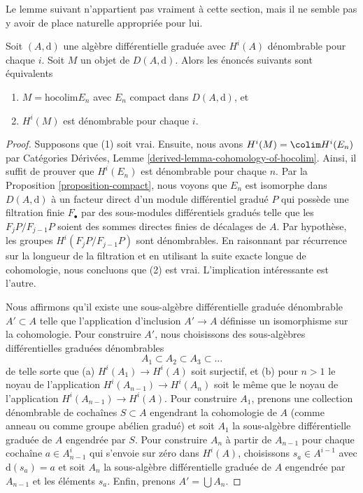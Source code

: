 \noindent
Le lemme suivant n'appartient pas vraiment à cette section, mais il ne semble pas
y avoir de place naturelle appropriée pour lui.

\begin{lemma}
\label{lemma-countable}
Soit $(A, \text{d})$ une algèbre différentielle graduée avec $H^i(A)$ dénombrable
pour chaque $i$. Soit $M$ un objet de $D(A, \text{d})$. Alors les énoncés suivants
sont équivalents
\begin{enumerate}
\item $M = \text{hocolim} E_n$ avec $E_n$ compact dans $D(A, \text{d})$, et
\item $H^i(M)$ est dénombrable pour chaque $i$.
\end{enumerate}
\end{lemma}

\begin{proof}
Supposons que (1) soit vrai. Ensuite, nous avons $H^i(M) = \colim H^i(E_n)$ par
Catégories Dérivées, Lemme \ref{derived-lemma-cohomology-of-hocolim}. Ainsi, il
suffit de prouver que $H^i(E_n)$ est dénombrable pour chaque $n$. Par la
Proposition \ref{proposition-compact}, nous voyons que $E_n$ est isomorphe dans
$D(A, \text{d})$ à un facteur direct d'un module différentiel gradué $P$ qui
possède une filtration finie $F_\bullet$ par des sous-modules différentiels
gradués telle que les $F_jP/F_{j - 1}P$ soient des sommes directes finies de décalages
de $A$. Par hypothèse, les groupes $H^i(F_jP/F_{j - 1}P)$ sont dénombrables. En
raisonnant par récurrence sur la longueur de la filtration et en utilisant la suite
exacte longue de cohomologie, nous concluons que (2) est vrai.
L'implication intéressante est l'autre.

\medskip\noindent
Nous affirmons qu'il existe une sous-algèbre différentielle graduée dénombrable
$A' \subset A$ telle que l'application d'inclusion $A' \to A$ définisse un
isomorphisme sur la cohomologie. Pour construire $A'$, nous choisissons des
sous-algèbres différentielles graduées dénombrables
$$
A_1 \subset A_2 \subset A_3 \subset \ldots
$$
de telle sorte que (a) $H^i(A_1) \to H^i(A)$ soit surjectif, et (b) pour $n > 1$
le noyau de l'application $H^i(A_{n - 1}) \to H^i(A_n)$ soit le même que le noyau
de l'application $H^i(A_{n - 1}) \to H^i(A)$. Pour construire $A_1$, prenons une
collection dénombrable de cochaînes $S \subset A$ engendrant la cohomologie de $A$
(comme anneau ou comme groupe abélien gradué) et soit $A_1$ la
sous-algèbre différentielle graduée de $A$ engendrée par $S$. Pour construire $A_n$
à partir de $A_{n - 1}$ pour chaque cochaîne $a \in A_{n - 1}^i$ qui s'envoie sur
zéro dans $H^i(A)$, choisissons $s_a \in A^{i - 1}$ avec $\text{d}(s_a) = a$ et
soit $A_n$ la sous-algèbre différentielle graduée de $A$ engendrée par $A_{n
- 1}$ et les éléments $s_a$. Enfin, prenons $A' = \bigcup A_n$.


\end{proof}
